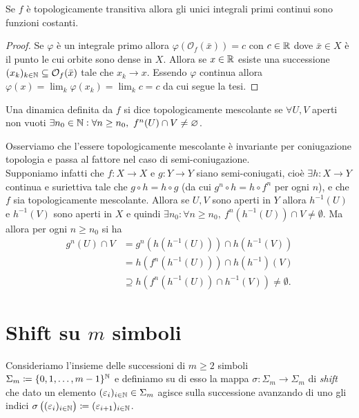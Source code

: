 \begin{proposition}
    Se $ f $ è topologicamente transitiva allora gli unici integrali primi continui sono funzioni costanti.
\end{proposition}
%
\begin{proof}
    Se $ \varphi $ è un integrale primo allora $ \varphi(\mathcal{O}_f(\bar{x})) = c $ con $ c \in \mathbb{R} $ dove $ \bar{x} \in X $ è il punto le cui orbite sono dense in $ X $. Allora se $ x \in \mathbb{R} $ esiste una successione $ (x_k)_{k \in \mathbb{N}} \subseteq \mathcal{O}_f(\bar{x}) $ tale che $ x_k \to x $. Essendo $ \varphi $ continua allora $ \varphi(x) = \lim_{k} \varphi(x_k) = \lim_{k} c = c $ da cui segue la tesi.
\end{proof}

\begin{definition}
    Una dinamica definita da $ f $ si dice topologicamente mescolante se $ \forall U, V $ aperti non vuoti $ \exists n_0 \in \mathbb{N} : \forall n \geq n_0, \ f^n(U) \cap V \neq \varnothing $.
\end{definition}

Osserviamo che l'essere topologicamente mescolante è invariante per coniugazione topologia e passa al fattore nel caso di semi-coniugazione. \\
Supponiamo infatti che $ f \colon X \to X $ e $ g \colon Y \to Y $ siano semi-coniugati, cioè $ \exists h \colon X \to Y $ continua e suriettiva tale che $ g \circ h = h \circ g $ (da cui $ g^n \circ h = h \circ f^n $ per ogni $ n $), e che $ f $ sia topologicamente mescolante. Allora se $ U, V $ sono aperti in $ Y $ allora $ h^{-1}(U) $ e $ h^{-1}(V) $ sono aperti in $ X $ e quindi $ \exists n_0 : \forall n \geq n_0, \ f^{n}(h^{-1}(U)) \cap V \neq \emptyset $. Ma allora per ogni $ n \geq n_0 $ si ha
\begin{align*}
    g^n(U) \cap V & = g^{n}(h(h^{-1}(U))) \cap h(h^{-1}(V)) \\
    & = h(f^n(h^{-1}(U))) \cap h(h^{-1})(V) \\
    & \supseteq h\left(f^n(h^{-1}(U)) \cap h^{-1}(V)\right) \neq \emptyset.
\end{align*}

\section{Shift su $ m $ simboli}
Consideriamo l'insieme delle successioni di $ m \geq 2 $ simboli $ \Sigma_m \coloneqq \{0, 1, \ldots, m-1\}^{\mathbb{N}} $ e definiamo su di esso la mappa $ \sigma \colon \Sigma_m \to \Sigma_m $ di \emph{shift} che dato un elemento $ (\varepsilon_i)_{i \in \mathbb{N}} \in \Sigma_m $ agisce sulla successione avanzando di uno gli indici $ \sigma\left((\varepsilon_i)_{i \in \mathbb{N}}\right) \coloneqq (\varepsilon_{i + 1})_{i \in \mathbb{N}} $. \\

